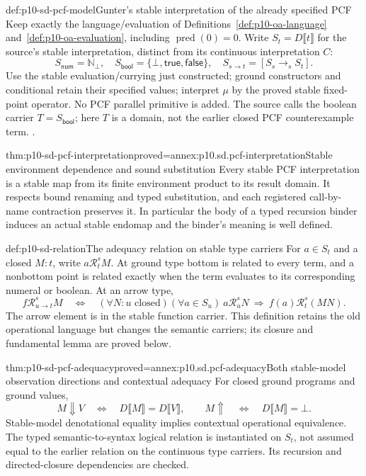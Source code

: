\begin{hbdefinition}{def:p10-sd-pcf-model}{Gunter's stable interpretation of the already specified PCF}
Keep exactly the language/evaluation of Definitions~\ref{def:p10-oa-language}
and~\ref{def:p10-oa-evaluation}, including \(\operatorname{pred}(0)=0\).
Write \(S_t=D\llbracket t\rrbracket\) for the source's stable
interpretation, distinct from its continuous interpretation \(C\):
\[
 S_{\mathsf{num}}=\mathbb N_{\bot},\quad
 S_{\mathsf{bool}}=\{\bot,\mathsf{true},\mathsf{false}\},\quad
 S_{s\to t}=[S_s\longrightarrow_s S_t].
\]
Use the stable evaluation/currying just constructed; ground constructors
and conditional retain their specified values; interpret \(\mu\) by
the proved stable fixed-point operator. No PCF parallel primitive is added.
The source calls the boolean carrier \(T=S_{\mathsf{bool}}\); here
\(T\) is a domain, not the earlier closed PCF counterexample term.
\cite[Lemma~4.4.5, p.~36]{Gunter1994TypesAuthorOA}.
\end{hbdefinition}

\begin{hbtheorem}{thm:p10-sd-pcf-interpretation}{proved=annex:p10.sd.pcf-interpretation}{Stable environment dependence and sound substitution}
Every stable PCF interpretation is a stable map from its finite environment
product to its result domain. It respects bound renaming and typed
substitution, and each registered call-by-name contraction preserves it.
In particular the body of a typed recursion binder induces an actual
stable endomap and the binder's meaning is well defined.
\end{hbtheorem}

\begin{hbdefinition}{def:p10-sd-relation}{The adequacy relation on stable type carriers}
For \(a\in S_t\) and a closed \(M:t\), write
\(a\mathrel{\mathcal R^s_t}M\). At ground type bottom is related
to every term, and a nonbottom point is related exactly when the term
evaluates to its corresponding numeral or boolean. At an arrow type,
\[
 f\mathrel{\mathcal R^s_{u\to t}}M\quad\Longleftrightarrow\quad
 (\forall N:u\text{ closed})(\forall a\in S_u)\
 a\mathrel{\mathcal R^s_u}N\ \Longrightarrow\
 f(a)\mathrel{\mathcal R^s_t}(M N).
\]
The arrow element is in the stable function carrier. This definition
retains the old operational language but changes the semantic carriers;
its closure and fundamental lemma are proved below.
\end{hbdefinition}

\begin{hbtheorem}{thm:p10-sd-pcf-adequacy}{proved=annex:p10.sd.pcf-adequacy}{Both stable-model observation directions and contextual adequacy}
For closed ground programs and ground values,
\[
 M\Downarrow V\quad\Longleftrightarrow\quad
             D\llbracket M\rrbracket=D\llbracket V\rrbracket,
 \qquad
 M\Uparrow\quad\Longleftrightarrow\quad D\llbracket M\rrbracket=\bot.
\]
Stable-model denotational equality implies contextual operational
equivalence. The typed semantic-to-syntax logical relation is instantiated
on \(S_t\), not assumed equal to the earlier relation on the continuous
type carriers. Its recursion and directed-closure dependencies are checked.
\end{hbtheorem}

